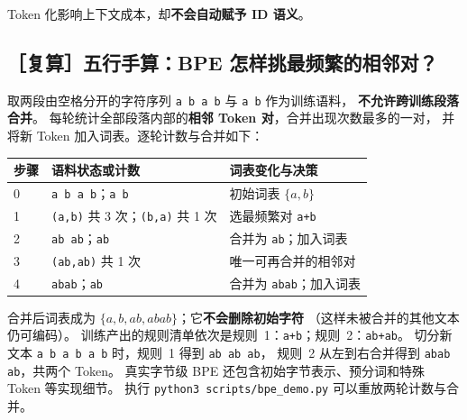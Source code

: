 Token 化影响上下文成本，却\textbf{不会自动赋予 ID 语义}。


\subsection{［复算］五行手算：BPE 怎样挑最频繁的相邻对？}

取两段由空格分开的字符序列 \texttt{a b a b} 与 \texttt{a b} 作为训练语料，
\textbf{不允许跨训练段落合并}。
每轮统计全部段落内部的\textbf{相邻 Token 对}，合并出现次数最多的一对，
并将新 Token 加入词表。逐轮计数与合并如下：

\begin{center}\small
{}
\begin{tabularx}{\linewidth}{@{}p{11mm}p{47mm}X@{}}
\toprule
步骤 & 语料状态或计数 & 词表变化与决策\\\midrule
0 & \texttt{a b a b}；\texttt{a b} & 初始词表 $\{a,b\}$\\
1 & \texttt{(a,b)} 共 3 次；\texttt{(b,a)} 共 1 次 & 选最频繁对 \texttt{a+b}\\
2 & \texttt{ab ab}；\texttt{ab} & 合并为 \texttt{ab}；加入词表\\
3 & \texttt{(ab,ab)} 共 1 次 & 唯一可再合并的相邻对\\
4 & \texttt{abab}；\texttt{ab} & 合并为 \texttt{abab}；加入词表\\
\bottomrule
\end{tabularx}
\end{center}

合并后词表成为 $\{a,b,ab,abab\}$；它\textbf{不会删除初始字符}
（这样未被合并的其他文本仍可编码）。
训练产出的规则清单依次是规则~1：\texttt{a+b}；规则~2：\texttt{ab+ab}。
切分新文本 \texttt{a b a b a b} 时，规则~1 得到 \texttt{ab ab ab}，
规则~2 从左到右合并得到 \texttt{abab ab}，共两个 Token。
真实字节级 BPE 还包含初始字节表示、预分词和特殊 Token 等实现细节。
执行 \texttt{python3 scripts/bpe\_demo.py} 可以重放两轮计数与合并。

